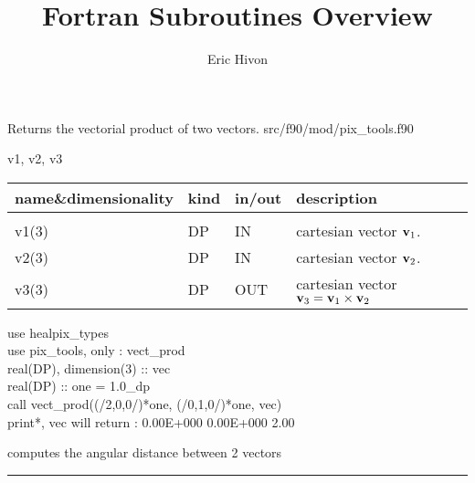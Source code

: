 
\sloppy


\title{\healpix Fortran Subroutines Overview}
 \section[vect\_prod]{ }
\label{sub:vect_prod}
\author{Eric Hivon}

\begin{facility}
{Returns the vectorial product of two vectors.} 
{src/f90/mod/pix\_tools.f90}
\end{facility}

\begin{f90format}
{v1, v2, v3}
\end{f90format}

\begin{arguments}
{
\begin{tabular}{p{0.25\hsize} p{0.05\hsize} p{0.1\hsize} p{0.5\hsize}} \hline 
\textbf{name\&dimensionality} & \textbf{kind} & \textbf{in/out} & \textbf{description} \\ \hline
                   &   &   &                           \\ %
v1(3) & DP & IN & cartesian vector ${\bf v}_1$. \\
v2(3) & DP & IN & cartesian vector ${\bf v}_2$. \\
v3(3) & DP & OUT & cartesian vector ${\bf v}_3 = {\bf v}_1 \times {\bf v}_2$ \\
\end{tabular}
}
\end{arguments}

\begin{example}
{
use healpix\_types \\
use pix\_tools,    only : vect\_prod \\
real(DP), dimension(3) :: vec\\
real(DP) :: one = 1.0\_dp \\
call vect\_prod((/2,0,0/)*one, (/0,1,0/)*one, vec)  \\
print*, vec
}
{
will return : 0.00E+000  0.00E+000   2.00
}
\end{example}

\begin{related}
  \begin{sulist}{} %
  \item[\htmlref{angdist}{sub:angdist}] computes the angular distance between 2 vectors
  \end{sulist}
\end{related}

\rule{\hsize}{2mm}

\newpage
